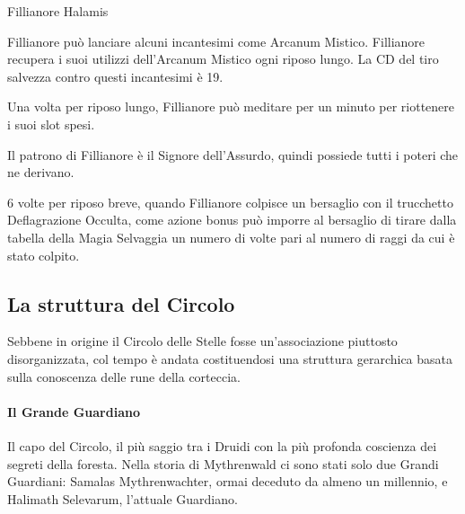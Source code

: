 \begin{DndMonster}[float*=b,width=\textwidth + 8pt]{Fillianore Halamis}
\begin{multicols}{2}
    Fillianore può lanciare alcuni incantesimi come Arcanum Mistico. Fillianore recupera i suoi utilizzi dell'Arcanum Mistico ogni riposo lungo. La CD del tiro salvezza contro questi incantesimi è 19.
    \begin{DndMonsterSpells}
    \end{DndMonsterSpells}

    Una volta per riposo lungo, Fillianore può meditare per un minuto per riottenere i suoi slot spesi.

    Il patrono di Fillianore è il Signore dell'Assurdo, quindi possiede tutti i poteri che ne derivano.

    6 volte per riposo breve, quando Fillianore colpisce un bersaglio con il trucchetto Deflagrazione Occulta, come azione bonus può imporre al bersaglio di tirare dalla tabella della Magia Selvaggia un numero di volte pari al numero di raggi da cui è stato colpito.

  \end{multicols}
\end{DndMonster}

\subsection{La struttura del Circolo}

Sebbene in origine il Circolo delle Stelle fosse un'associazione piuttosto disorganizzata, col tempo è andata costituendosi una struttura gerarchica basata sulla conoscenza delle rune della corteccia.

\paragraph{Il Grande Guardiano} Il capo del Circolo, il più saggio tra i Druidi con la più profonda coscienza dei segreti della foresta. Nella storia di Mythrenwald ci sono stati solo due Grandi Guardiani: Samalas Mythrenwachter, ormai deceduto da almeno un millennio, e Halimath Selevarum, l'attuale Guardiano.

